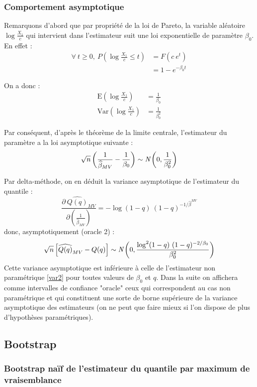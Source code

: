 \documentclass{article}
\renewcommand*{\(}{ \left( }
\renewcommand*{\)}{ \right) }
\begin{document}
\subsubsection{Comportement asymptotique}

Remarquons d'abord que par propriété de la loi de Pareto, la variable aléatoire $ \log \frac{X_1}{c} $ qui intervient dans l'estimateur suit une loi exponentielle de paramètre $\beta_0$. En effet :
\begin{align*}
\forall\ t \geq 0, \ P(\log \frac{X_1}{c} \leq t) &= F(c \ e^t) \\
&= 1 - e^{-\beta_0 t}
\end{align*}

On a donc :
\begin{align*}
\text{E} \left( \log \frac{X_{1}}{c} \right) &= \frac{1}{\beta_0} \\
\text{Var} \left( \log \frac{X_{1}}{c} \right) &= \frac{1}{\beta_0^2}
\end{align*}

Par conséquent, d'après le théorème de la limite centrale, l'estimateur du paramètre a la loi asymptotique suivante : 
\[ \sqrt{n} \left( \frac{1}{\widehat{\beta}_{MV}} - \frac{1}{\beta_0} \right) \sim \emph{N} \left( 0, \frac{1}{\beta_0^2} \right) \]

Par delta-méthode, on en déduit la variance asymptotique de l'estimateur du quantile :
\[ \frac{\partial \ \widehat{Q(q)}_{MV}} {\partial (\frac{1}{\widehat{\beta}_{MV}}) } = -\log(1-q)\ (1-q)^{-1/\widehat{\beta}^{MV}} \]
donc, asymptotiquement (oracle 2) :
\[ \label{var2} \sqrt{n} \left[ \widehat{Q(q)}_{MV} - Q(q) \right] \sim \emph{N} \left( 0, \frac{\log^2(1-q)\ (1-q)^{-2/\beta_0}}{\beta_0^2}  \right) \]
Cette variance asymptotique est inférieure à celle de l'estimateur non paramétrique \eqref{var2} pour toutes valeurs de $\beta_0$ et $q$. Dans la suite on affichera comme intervalles de confiance "oracle" ceux qui correspondent au cas non paramétrique et qui constituent une sorte de borne supérieure de la variance asymptotique des estimateurs (on ne peut que faire mieux si l'on dispose de plus d'hypothèses paramétriques). 

\subsection{Bootstrap}

\subsubsection{Bootstrap naïf de l'estimateur du quantile par maximum de vraisemblance}
\end{document}

